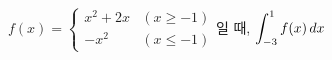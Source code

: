 $f(x)=\begin{cases} x^2+2x & (x\ge -1) \\ -x^2 & (x\le -1) \end{cases}$일 때, $\displaystyle\int_{-3}^{1} f(x)\mkern3mu dx$
